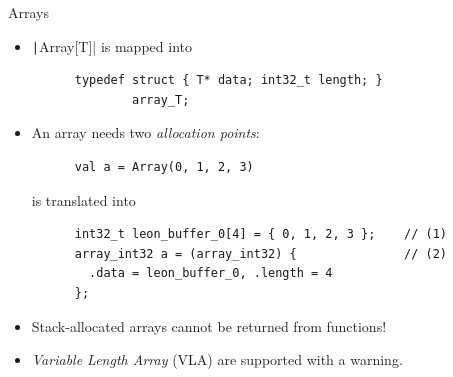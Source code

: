 \documentclass[xcolor={usenames,dvipsnames}]{beamer}
\newcommand{\InlineS}[1]{\texttt|#1|}
\begin{document}
\begin{frame}[fragile]{Arrays}

  \begin{itemize}

    \item \InlineS{Array[T]} is mapped into
      \begin{verbatim}
      typedef struct { T* data; int32_t length; }
              array_T;
      \end{verbatim}

    \pause

    \item An array needs two \emph{allocation points}:\\
      \begin{verbatim}
      val a = Array(0, 1, 2, 3)
      \end{verbatim}
      is translated into
      \begin{verbatim}
      int32_t leon_buffer_0[4] = { 0, 1, 2, 3 };    // (1)
      array_int32 a = (array_int32) {               // (2)
        .data = leon_buffer_0, .length = 4
      };
      \end{verbatim}

    \pause

    \item \alert{Stack-allocated arrays cannot be returned from functions!}

    \item \emph{Variable Length Array} (VLA) are supported with a warning.

  \end{itemize}

\end{frame}
\end{document}

